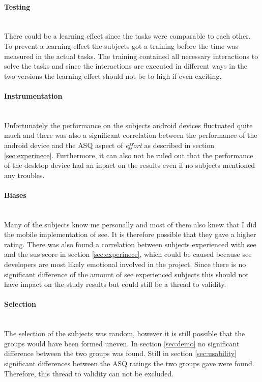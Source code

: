 \paragraph{Testing}\mbox{}\\
There could be a learning effect since the tasks were comparable to each other. 
To prevent a learning effect the subjects got a training before the time was measured in the actual tasks.
The training contained all necessary interactions to solve the tasks and since the interactions are executed in different ways in the two versions the learning effect should not be to high if even exciting.

\paragraph{Instrumentation}\mbox{}\\
Unfortunately the performance on the subjects \gls{android} devices fluctuated quite much and there was also a significant correlation between the performance of the \gls{android} device and the \gls{ASQ} aspect of \textit{effort} as described in section \ref{sec:experinece}.
Furthermore, it can also not be ruled out that the performance of the desktop device had an inpact on the results even if no subjects mentioned any troubles.
\paragraph{Biases}\mbox{}\\
Many of the subjects know me personally and most of them also knew that I did the mobile implementation of \gls{see}. 
It is therefore possible that they gave a higher rating. 
There was also found a correlation between subjects experienced with \gls{see} and the \gls{sus} score in section \ref{sec:experinece}, which could be caused because \gls{see} developers are most likely emotional involved in the project.
Since there is no significant difference of the amount of \gls{see} experienced subjects this should not have impact on the study results but could still be a thread to validity.
\paragraph{Selection}\mbox{}\\
The selection of the subjects was random, however it is still possible that the groups would have been formed uneven.
In section \ref{sec:demo} no significant difference between the two groups was found.
Still in section \ref{sec:usability} significant differences between the \gls{ASQ} ratings the two groups gave were found.
Therefore, this thread to validity can not be excluded. 
